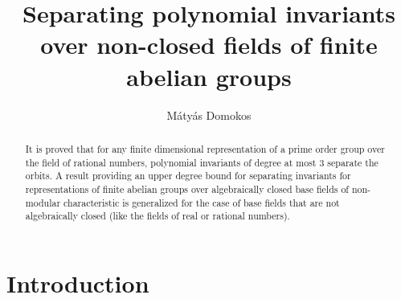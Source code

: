\documentclass[12pt, oneside]{amsart}
\title{Separating polynomial invariants over non-closed fields of finite abelian groups}
\author[M. Domokos]{M\'aty\'as Domokos}
\begin{document}
\maketitle

\begin{abstract}
It is proved that for any finite dimensional representation of a prime order group over the field of rational numbers, 
polynomial invariants of degree at most $3$ separate the orbits. 
A result providing an upper degree bound for separating invariants for representations of finite abelian groups  over algebraically closed base fields of non-modular 
characteristic  is generalized for the case of base  
fields that are not algebraically closed (like the fields of real or rational numbers). 
\end{abstract}

\section{Introduction} 
\end{document}
